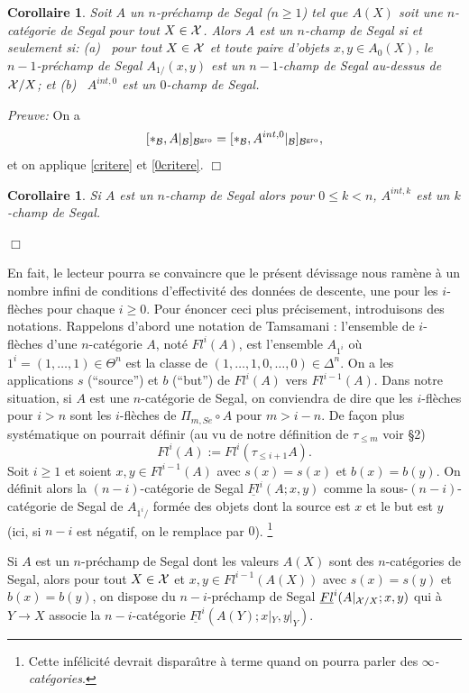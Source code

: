 \documentclass[12pt]{article}
\newcommand{\eop}{\hfill $\Box$\vspace{.1in}}
\newtheorem{corollaire}[lemma]{Corollaire}
\newcommand{\Bb}{{\cal B}}
\newcommand{\Xx}{{\cal X}}
\begin{document}
\begin{corollaire}
\label{devissage}
Soit $A$ un $n$-pr\'echamp de Segal ($n\geq 1$) tel que $A(X)$ soit une
$n$-cat\'egorie
de Segal pour tout $X\in \Xx$. Alors $A$ est un $n$-champ de Segal
si et seulement si:
\newline
(a) \,  pour tout $X\in \Xx$ et toute paire d'objets $x,y\in A_0(X)$, le
$n-1$-pr\'echamp de Segal $A_{1/}(x,y)$ est un $n-1$-champ de Segal au-dessus de
$\Xx /X$; et
\newline
(b) \, $A^{int, 0}$ est un $0$-champ de Segal.
\end{corollaire}
{\em Preuve:}
On a
$$
[\ast _{\Bb}, A|_{\Bb}]_{\Bb ^{\rm gro}} =
[\ast _{\Bb}, A^{int, 0}|_{\Bb}]_{\Bb ^{\rm gro}} ,
$$
et on applique \ref{critere} et \ref{0critere}.
\eop


\begin{corollaire}
Si $A$ est un $n$-champ de Segal alors pour $0\leq k < n$, $A^{int,k}$ est un
$k$-champ de Segal.
\end{corollaire}
\eop


En fait, le lecteur pourra se convaincre que le pr\'esent d\'evissage nous
ram\`ene
\`a un nombre infini de conditions d'effectivit\'e des donn\'ees de
descente, une pour les $i$-fl\`eches pour chaque $i\geq 0$. Pour \'enoncer ceci
plus pr\'ecisement, introduisons des notations. Rappelons d'abord une notation
de Tamsamani \cite{Tamsamani}: l'ensemble de $i$-fl\`eches d'une
$n$-cat\'egorie $A$, not\'e $Fl^i(A)$, est l'ensemble $A_{1^i}$
o\`u $1^i = (1,\ldots , 1)\in \Theta ^n$ est la classe de $(1,\ldots ,
1,0,\ldots , 0)\in \Delta
^n$. On a les applications $s$ (``source'') et $b$ (``but'') de
$Fl^i(A)$ vers $Fl^{i-1}(A)$. Dans notre situation, si $A$ est une
$n$-cat\'egorie de Segal, on conviendra de dire que les
$i$-fl\`eches pour $i>n$ sont les $i$-fl\`eches de $\Pi _{m,Se}\circ A$
pour $m> i-n$.  De fa\c{c}on plus syst\'ematique on pourrait d\'efinir
(au vu de notre d\'efinition de $\tau _{\leq m}$ voir \S 2)
$$
Fl^i(A):= Fl^i(\tau _{\leq i+1}A).
$$
Soit $i\geq 1$ et soient $x,y\in Fl^{i-1}(A)$ avec $s(x)=s(x)$ et $b(x)=b(y)$.
On d\'efinit alors la $(n-i)$-cat\'egorie de Segal
$\underline{Fl}^i(A; x,y)$ comme
la sous-$(n-i)$-cat\'egorie de Segal de $A_{1^i/}$ form\'ee des objets
dont la source est $x$ et le but est $y$ (ici, si $n-i$ est n\'egatif, on le
remplace par $0$).
\footnote{
Cette inf\'elicit\'e devrait dispara\^{\i}tre \`a terme quand on pourra
parler des
{\em $\infty$-cat\'egories}.}

Si $A$ est un $n$-pr\'echamp de Segal dont les valeurs $A(X)$ sont des
$n$-cat\'egories de Segal, alors pour tout $X\in \Xx$ et $x,y\in
Fl^{i-1}(A(X))$ avec $s(x)=s(y)$ et $b(x)=b(y)$, on dispose du $n-i$-pr\'echamp
de Segal $\underline{Fl}^i(A|_{\Xx /X}; x,y)$ qui \`a
$Y\rightarrow X$ associe la $n-i$-cat\'egorie
$\underline{Fl}^i(A(Y); x|_Y,y|_Y)$.
\end{document}
